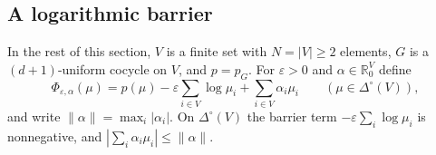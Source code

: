 \documentclass[11pt]{article}
\theoremstyle{definition}
\numberwithin{equation}{section}
\newcommand{\R}{\mathbb R}
\begin{document}
\subsection{A logarithmic barrier}

In the rest of this section, $V$ is a finite set with $N=|V|\ge2$ elements, $G$ is a $(d+1)$-uniform cocycle on $V$, and $p=p_G$. For $\varepsilon>0$ and $\alpha\in\R^V_0$ define
\begin{equation*}
 \Phi_{\varepsilon,\alpha}(\mu)=p(\mu)-\varepsilon\sum_{i\in V}\log\mu_i+\sum_{i\in V}\alpha_i\mu_i\qquad(\mu\in\Delta^\circ(V)),
\end{equation*}
and write $\|\alpha\|=\max_i|\alpha_i|$. On $\Delta^\circ(V)$ the barrier term $-\varepsilon\sum_i\log\mu_i$ is nonnegative, and $|\sum_i\alpha_i\mu_i|\le\|\alpha\|$.
\end{document}
